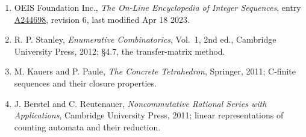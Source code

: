 \documentclass[11pt]{article}
\theoremstyle{definition}
\begin{document}
\begin{enumerate}

\item OEIS Foundation Inc., \emph{The On-Line Encyclopedia of Integer Sequences}, entry \href{https://oeis.org/A244698}{A244698}, revision 6, last modified Apr 18 2023.

\item R. P. Stanley, \emph{Enumerative Combinatorics}, Vol.~1, 2nd ed., Cambridge University Press, 2012; \S4.7, the transfer-matrix method.

\item M. Kauers and P. Paule, \emph{The Concrete Tetrahedron}, Springer, 2011; C-finite sequences and their closure properties.

\item J. Berstel and C. Reutenauer, \emph{Noncommutative Rational Series with Applications}, Cambridge University Press, 2011; linear representations of counting automata and their reduction.

\end{enumerate}
\end{document}
